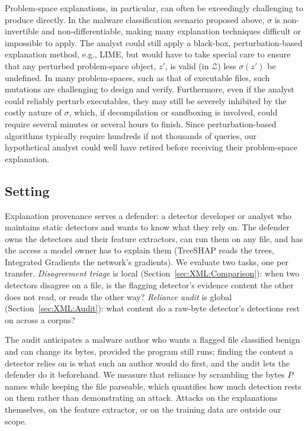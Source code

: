 Problem-space explanations, in particular, can often be exceedingly challenging to produce directly. In the malware classification scenario proposed above, $\sigma$ is non-invertible and non-differentiable, making many explanation techniques difficult or impossible to apply. The analyst could still apply a black-box, perturbation-based explanation method, e.g., LIME, but would have to take special care to ensure that any perturbed problem-space object, $z'$, is valid (in $\mathcal{Z}$) less $\sigma(z')$ be undefined. In many problem-spaces, such as that of executable files, such mutations are challenging to design and verify. Furthermore, even if the analyst could reliably perturb executables, they may still be severely inhibited by the costly nature of $\sigma$, which, if decompilation or sandboxing is involved, could require several minutes or several hours to finish. Since perturbation-based algorithms typically require hundreds if not thousands of queries, our hypothetical analyst could well have retired before receiving their problem-space explanation.

\subsection{Setting}
\label{sec:XML:ThreatModel}

Explanation provenance serves a defender: a detector developer or analyst who maintains static detectors and wants to know what they rely on. The defender owns the detectors and their feature extractors, can run them on any file, and has the access a model owner has to explain them (TreeSHAP reads the trees, Integrated Gradients the network's gradients). We evaluate two tasks, one per transfer. \textit{Disagreement triage} is local (Section~\ref{sec:XML:Comparison}): when two detectors disagree on a file, is the flagging detector's evidence content the other does not read, or reads the other way? \textit{Reliance audit} is global (Section~\ref{sec:XML:Audit}): what content do a raw-byte detector's detections rest on across a corpus?

The audit anticipates a malware author who wants a flagged file classified benign and can change its bytes, provided the program still runs; finding the content a detector relies on is what such an author would do first, and the audit lets the defender do it beforehand. We measure that reliance by scrambling the bytes $P$ names while keeping the file parseable, which quantifies how much detection rests on them rather than demonstrating an attack. Attacks on the explanations themselves, on the feature extractor, or on the training data are outside our scope.
